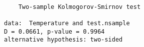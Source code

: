 \begin{verbatim} 

	Two-sample Kolmogorov-Smirnov test

data:  Temperature and test.nsample
D = 0.0661, p-value = 0.9964
alternative hypothesis: two-sided

\end{verbatim}